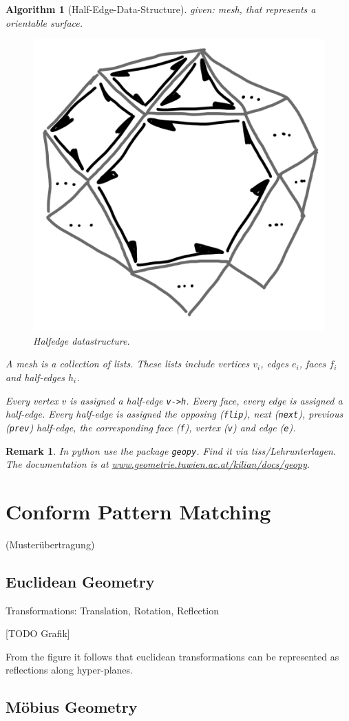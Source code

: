 \documentclass[]{article}
\newtheorem{algorithm}{Algorithm}
\newtheorem{remark}{Remark}
\begin{document}
\begin{algorithm}[Half-Edge-Data-Structure]
	given: mesh, that represents a orientable surface.
	
	\begin{figure}[h!]
		\centering
		\includegraphics[width=0.3\linewidth]{figures/halfedge}
		\caption{Halfedge datastructure.}
		\label{fig:halfedge}
	\end{figure}
	
	A mesh is a collection of lists. These lists include vertices $v_i$, edges $e_i$, faces $f_i$ and half-edges $h_i$.
	
	Every vertex $v$ is assigned a half-edge \texttt{v->h}. Every face, every edge is assigned a half-edge. Every half-edge is assigned the opposing (\texttt{flip}), next (\texttt{next}), previous (\texttt{prev}) half-edge, the corresponding face (\texttt{f}), vertex (\texttt{v}) and edge (\texttt{e}).
\end{algorithm}

\begin{remark}
	In python use the package \texttt{geopy}. Find it via tiss/Lehrunterlagen. The documentation is at \url{www.geometrie.tuwien.ac.at/kilian/docs/geopy}.
\end{remark}

\section{Conform Pattern Matching}
(Musterübertragung)

\subsection{Euclidean Geometry}

Transformations: Translation, Rotation, Reflection

[TODO Grafik]

From the figure it follows that euclidean transformations can be represented as reflections along hyper-planes.

\subsection{Möbius Geometry}
\end{document}
